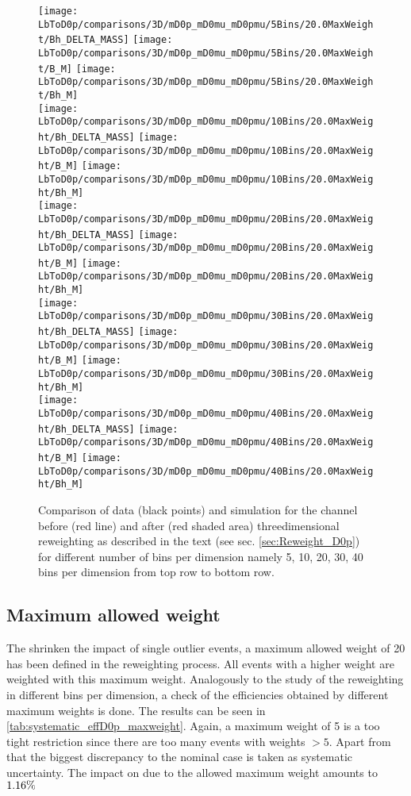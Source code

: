 \begin{figure}[hptb]
	\centering
	\texttt{[image: LbToD0p/comparisons/3D/mD0p\_mD0mu\_mD0pmu/5Bins/20.0MaxWeight/Bh\_DELTA\_MASS]}
	\texttt{[image: LbToD0p/comparisons/3D/mD0p\_mD0mu\_mD0pmu/5Bins/20.0MaxWeight/B\_M]}
	\texttt{[image: LbToD0p/comparisons/3D/mD0p\_mD0mu\_mD0pmu/5Bins/20.0MaxWeight/Bh\_M]} \\
	\texttt{[image: LbToD0p/comparisons/3D/mD0p\_mD0mu\_mD0pmu/10Bins/20.0MaxWeight/Bh\_DELTA\_MASS]}
	\texttt{[image: LbToD0p/comparisons/3D/mD0p\_mD0mu\_mD0pmu/10Bins/20.0MaxWeight/B\_M]}
	\texttt{[image: LbToD0p/comparisons/3D/mD0p\_mD0mu\_mD0pmu/10Bins/20.0MaxWeight/Bh\_M]} \\
	\texttt{[image: LbToD0p/comparisons/3D/mD0p\_mD0mu\_mD0pmu/20Bins/20.0MaxWeight/Bh\_DELTA\_MASS]}
	\texttt{[image: LbToD0p/comparisons/3D/mD0p\_mD0mu\_mD0pmu/20Bins/20.0MaxWeight/B\_M]}
	\texttt{[image: LbToD0p/comparisons/3D/mD0p\_mD0mu\_mD0pmu/20Bins/20.0MaxWeight/Bh\_M]} \\
	\texttt{[image: LbToD0p/comparisons/3D/mD0p\_mD0mu\_mD0pmu/30Bins/20.0MaxWeight/Bh\_DELTA\_MASS]}
	\texttt{[image: LbToD0p/comparisons/3D/mD0p\_mD0mu\_mD0pmu/30Bins/20.0MaxWeight/B\_M]}
	\texttt{[image: LbToD0p/comparisons/3D/mD0p\_mD0mu\_mD0pmu/30Bins/20.0MaxWeight/Bh\_M]} \\
	\texttt{[image: LbToD0p/comparisons/3D/mD0p\_mD0mu\_mD0pmu/40Bins/20.0MaxWeight/Bh\_DELTA\_MASS]}
	\texttt{[image: LbToD0p/comparisons/3D/mD0p\_mD0mu\_mD0pmu/40Bins/20.0MaxWeight/B\_M]}
	\texttt{[image: LbToD0p/comparisons/3D/mD0p\_mD0mu\_mD0pmu/40Bins/20.0MaxWeight/Bh\_M]} 
	\caption{Comparison of data (black points) and simulation for the \LbToDpmunuX channel before (red line) and after (red shaded area) threedimensional reweighting as described in the text (see sec. \ref{sec:Reweight_D0p}) for different number of bins per dimension namely 5, 10, 20, 30, 40 bins per dimension from top row to bottom row.}
	\label{fig:reweighting_nbins}
\end{figure}

\subsection{Maximum allowed weight}
The shrinken the impact of single outlier events, a maximum allowed weight of 20 has been defined in the reweighting process.
All events with a higher weight are weighted with this maximum weight.
Analogously to the study of the reweighting in different bins per dimension, a check of the efficiencies obtained by different maximum weights is done.
The results can be seen in \ref{tab:systematic_effD0p_maxweight}.
Again, a maximum weight of 5 is a too tight restriction since there are too many events with weights $> 5$.
Apart from that the biggest discrepancy to the nominal case is taken as systematic uncertainty.
The impact on \R due to the allowed maximum weight amounts to $1.16\%$

